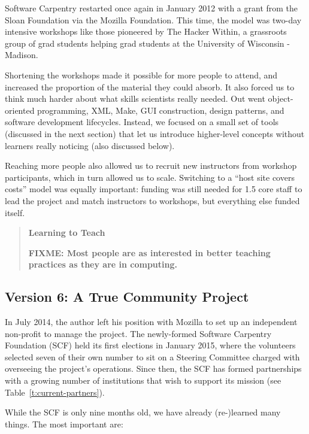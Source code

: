 \documentclass[10pt,a4paper,twocolumn]{article}
\newcommand{\fixme}[1]{\bf{FIXME: {#1}}}
\begin{document}
Software Carpentry restarted once again in January 2012 with a grant
from the Sloan Foundation via the Mozilla Foundation.  This time, the
model was two-day intensive workshops like those pioneered by The
Hacker Within, a grassroots group of grad students helping grad
students at the University of Wisconsin - Madison.

Shortening the workshops made it possible for more people to attend,
and increased the proportion of the material they could absorb. It
also forced us to think much harder about what skills scientists
really needed. Out went object-oriented programming, XML, Make, GUI
construction, design patterns, and software development lifecycles.
Instead, we focused on a small set of tools (discussed in the next
section) that let us introduce higher-level concepts without learners
really noticing (also discussed below).

Reaching more people also allowed us to recruit new instructors from
workshop participants, which in turn allowed us to scale. Switching to
a ``host site covers costs'' model was equally important: funding was
still needed for 1.5 core staff to lead the project and match
instructors to workshops, but everything else funded itself.

\begin{quote}
\textbf{Learning to Teach}

\fixme{Most people are as interested in better teaching practices as they are in computing.}

\end{quote}

\subsection*{Version 6: A True Community Project}

In July 2014, the author left his position with Mozilla to set up an
independent non-profit to manage the project.  The newly-formed
Software Carpentry Foundation (SCF) held its first elections in
January 2015, where the volunteers selected seven of their own number
to sit on a Steering Committee charged with overseeing the project's
operations.  Since then, the SCF has formed partnerships with a
growing number of institutions that wish to support its mission
(see Table~\ref{t:current-partners}).

While the SCF is only nine months old, we have already (re-)learned
many things.  The most important are:
\end{document}
